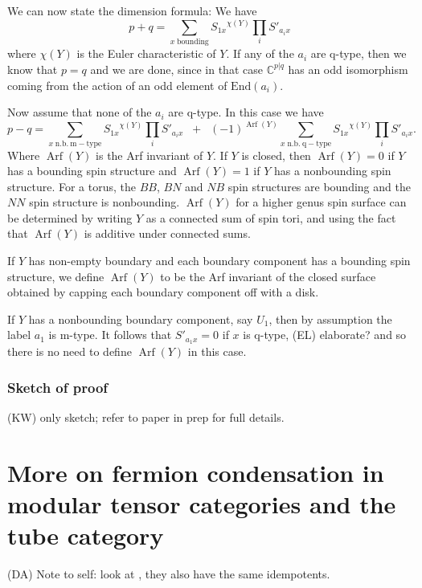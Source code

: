 \documentclass[12pt,a4paper]{article}
\newcommand{\cc}{\mathbb{C}}
\newcommand\be            {\begin{equation}}
\newcommand\ee            {\end{equation}}
\newcommand{\End}{\text{End}}
\DeclareMathOperator{\Arf}{Arf}
\newcommand{\kw}[1]{{\color{kwcolor}\footnotesize{(KW) #1}}}
\newcommand{\dave}[1]{{\color{ao(english)}\footnotesize{(DA) #1}}}
\newcommand{\ethan}[1]{{\color{amethyst}\footnotesize{(EL) #1}}}
\begin{document}
We can now state the dimension formula:
We have
\be
	p + q = \sum_{x\;  \mathrm{bounding}} {S_{1x}}^{\chi(Y)} {\textstyle \prod_i} S'_{a_i x} 
	\label{PplusQ}
\ee
where $\chi(Y)$ is the Euler characteristic of $Y$.
If any of the $a_i$ are q-type, then we know that $p=q$ and we are done, since in that case 
$\cc^{p|q}$ has an odd isomorphism coming from the action of an odd element of $\End(a_i)$.

Now assume that none of the $a_i$ are q-type.
In this case we have
\be
	p - q = \sum_{x\;  \mathrm{n.b.\ m-type}} {S_{1x}}^{\chi(Y)} {\textstyle \prod_i} S'_{a_i x}
			\;\;+\;\; (-1)^{\Arf(Y)} \sum_{x\;  \mathrm{n.b.\ q-type}} {S_{1x}}^{\chi(Y)} {\textstyle \prod_i} S'_{a_i x} .
			\label{PminusQ}
\ee
Where $\Arf(Y)$ is the Arf invariant of $Y$.
If $Y$ is closed, then $\Arf(Y) = 0$ if $Y$ has a bounding spin structure and 
$\Arf(Y) = 1$ if $Y$ has a nonbounding spin structure.
For a torus, the $BB$, $BN$ and $NB$ spin structures are bounding and the $NN$ spin structure is nonbounding.
$\Arf(Y)$ for a higher genus spin surface can be determined by writing $Y$ as a connected sum of spin tori,
and using the fact that $\Arf(Y)$ is additive under connected sums.

If $Y$ has non-empty boundary and each boundary component has a bounding spin structure, 
we define $\Arf(Y)$ to be the Arf invariant of the closed 
surface obtained by capping each boundary component off with a disk.

If $Y$ has a nonbounding boundary component, say $U_1$, then by assumption
the label $a_1$ is m-type.
It follows that $S'_{a_1 x} = 0$ if $x$ is q-type, \ethan{elaborate?} 
and so there is no need to define $\Arf(Y)$ in this case.




\subsubsection{Sketch of proof}


\kw{only sketch; refer to paper in prep for full details.}




\section{More on fermion condensation in modular tensor categories and the tube category} \label{more_on_tubes}

\dave{Note to self: look at \cite{Koenig2010}, they also have the same idempotents.}
\end{document}
